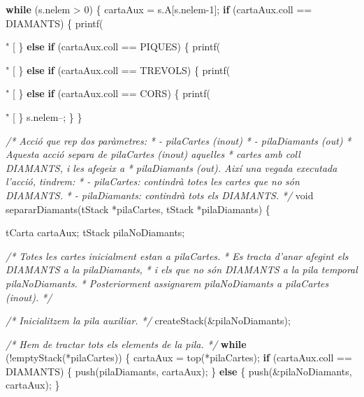 \documentclass[]{book}
\newenvironment{Shaded}{\begin{snugshade}}{\end{snugshade}}
\newcommand{\DataTypeTok}[1]{\textcolor[rgb]{0.13,0.29,0.53}{#1}}
\newcommand{\DecValTok}[1]{\textcolor[rgb]{0.00,0.00,0.81}{#1}}
\newcommand{\SpecialCharTok}[1]{\textcolor[rgb]{0.00,0.00,0.00}{#1}}
\newcommand{\StringTok}[1]{\textcolor[rgb]{0.31,0.60,0.02}{#1}}
\newcommand{\CommentTok}[1]{\textcolor[rgb]{0.56,0.35,0.01}{\textit{#1}}}
\newcommand{\ControlFlowTok}[1]{\textcolor[rgb]{0.13,0.29,0.53}{\textbf{#1}}}
\newcommand{\NormalTok}[1]{#1}
\begin{document}
\begin{Shaded}
\begin{Highlighting}[]
    \ControlFlowTok{while}\NormalTok{ (s.nelem > }\DecValTok{0}\NormalTok{) \{}
\NormalTok{        cartaAux = s.A[s.nelem-}\DecValTok{1}\NormalTok{]; }
        \ControlFlowTok{if}\NormalTok{ (cartaAux.coll == DIAMANTS) \{}
\NormalTok{            printf(}\StringTok{"  [%
\NormalTok{        \} }\ControlFlowTok{else} \ControlFlowTok{if}\NormalTok{ (cartaAux.coll == PIQUES) \{}
\NormalTok{            printf(}\StringTok{"  [%
\NormalTok{        \} }\ControlFlowTok{else} \ControlFlowTok{if}\NormalTok{ (cartaAux.coll == TREVOLS) \{}
\NormalTok{            printf(}\StringTok{"  [%
\NormalTok{        \} }\ControlFlowTok{else} \ControlFlowTok{if}\NormalTok{ (cartaAux.coll == CORS) \{}
\NormalTok{            printf(}\StringTok{"  [%
\NormalTok{        \}}
\NormalTok{        s.nelem--;}
\NormalTok{    \}}
\NormalTok{\}}

\CommentTok{/* Acció que rep dos paràmetres:}
\CommentTok{ * - pilaCartes (inout)}
\CommentTok{ * - pilaDiamants (out)}
\CommentTok{ * Aquesta acció separa de pilaCartes (inout) aquelles}
\CommentTok{ * cartes amb coll DIAMANTS, i les afegeix a}
\CommentTok{ * pilaDiamants (out). Així una vegada executada l'acció, tindrem:}
\CommentTok{ * - pilaCartes: contindrà totes les cartes que no són DIAMANTS.}
\CommentTok{ * - pilaDiamants: contindrà tots els DIAMANTS. }
\CommentTok{ */}
\DataTypeTok{void}\NormalTok{ separarDiamants(tStack *pilaCartes, tStack *pilaDiamants) \{}
    
\NormalTok{    tCarta cartaAux;}
\NormalTok{    tStack pilaNoDiamants;}
    
    \CommentTok{/* Totes les cartes inicialment estan a pilaCartes.}
\CommentTok{     * Es tracta d'anar afegint els DIAMANTS a la pilaDiamants,}
\CommentTok{     * i els que no són DIAMANTS a la pila temporal pilaNoDiamants.}
\CommentTok{     * Posteriorment assignarem pilaNoDiamants a pilaCartes (inout).}
\CommentTok{     */}
    
    \CommentTok{/* Inicialitzem la pila auxiliar. */}
\NormalTok{    createStack(&pilaNoDiamants);}
    
    \CommentTok{/* Hem de tractar tots els elements de la pila. */}
    \ControlFlowTok{while}\NormalTok{ (!emptyStack(*pilaCartes)) \{}
\NormalTok{        cartaAux = top(*pilaCartes);}
        \ControlFlowTok{if}\NormalTok{ (cartaAux.coll == DIAMANTS) \{}
\NormalTok{            push(pilaDiamants, cartaAux);}
\NormalTok{        \} }\ControlFlowTok{else}\NormalTok{ \{}
\NormalTok{            push(&pilaNoDiamants, cartaAux);            }
\NormalTok{        \}}
        
}}}}
\end{Highlighting}
\end{Shaded}
\end{document}
